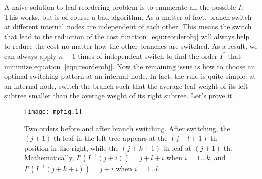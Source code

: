 A naive solution to leaf reordering problem is to enumerate all the possible $I$.
This works, but is of course a bad algorithm. As a matter of fact, branch switch at
different internal nodes are independent of each other. This means the switch that
lead to the reduction of the cost function~\ref{equ:reorderobj} will always help to
reduce the cost no matter how the other branches are switched. As a result,
we can always apply $n-1$ times of independent switch to find the order $I^*$
that minimize equation~\ref{equ:reorderobj}. Now the remaining issue is how
to choose an optimal switching pattern at an internal node. In fact, the rule is quite
simple: at an internal node, switch the branch such that the average leaf weight of its left subtree
smaller than the average weight of its right subtree. Let's prove it.

\begin{figure}[!hb]
\begin{center}
\texttt{[image: mpfig.1]}
\end{center}
\caption[Two orders before and after branch switching]
{Two orders before and after branch switching. After switching, the $(j+1)$-th leaf in the left tree
appears at the $(j+l+1)$-th position in the right, while the $(j+k+1)$-th leaf at $(j+1)$-th.
Mathematically, $I'(I^{-1}(j+i))=j+l+i$ when $i=1\ldots k$, and $I'(I^{-1}(j+k+i))=j+i$
when $i=1\ldots l$.
}\label{fig:orderfig}
\end{figure}

